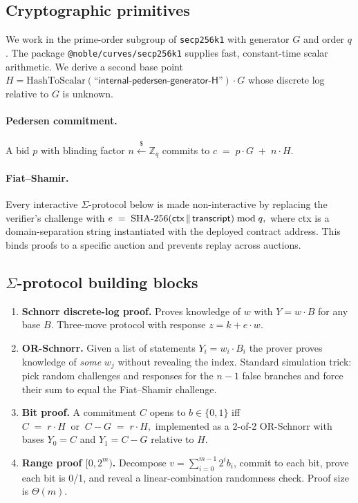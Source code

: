 \documentclass[11pt,a4paper]{article}
\begin{document}
\subsection{Cryptographic primitives}

We work in the prime-order subgroup of \texttt{secp256k1} with generator $G$
and order $q$. The package \texttt{@noble/curves/secp256k1} supplies fast,
constant-time scalar arithmetic. We derive a second base point
$H = \mathrm{HashToScalar}(\textsf{``internal-pedersen-generator-H''})\cdot G$
whose discrete log relative to $G$ is unknown.

\paragraph{Pedersen commitment.} A bid $p$ with blinding factor
$n \xleftarrow{\$} \mathbb{Z}_q$ commits to
$
c \;=\; p\cdot G \;+\; n\cdot H.
$

\paragraph{Fiat--Shamir.} Every interactive $\Sigma$-protocol below is made
non-interactive by replacing the verifier's challenge with
$
e \;=\; \mathrm{SHA{\text -}256}(\textsf{ctx} \,\|\, \textsf{transcript}) \bmod q,
$
where \textsf{ctx} is a domain-separation string instantiated with the
deployed contract address. This binds proofs to a specific auction and
prevents replay across auctions.

\subsection{$\Sigma$-protocol building blocks}

\begin{enumerate}[leftmargin=*]
\item \textbf{Schnorr discrete-log proof.} Proves knowledge of $w$ with
$Y = w\cdot B$ for any base $B$. Three-move protocol with response
$z = k + e\cdot w$.
\item \textbf{OR-Schnorr.} Given a list of statements $Y_i = w_i\cdot B_i$ the
prover proves knowledge of \emph{some} $w_j$ without revealing the index.
Standard simulation trick: pick random challenges and responses for the
$n-1$ false branches and force their sum to equal the Fiat--Shamir challenge.
\item \textbf{Bit proof.} A commitment $C$ opens to $b\in\{0,1\}$ iff
$
C \;=\; r\cdot H \;\;\text{or}\;\; C - G \;=\; r\cdot H,
$
implemented as a 2-of-2 OR-Schnorr with bases $Y_0 = C$ and $Y_1 = C - G$
relative to $H$.
\item \textbf{Range proof $[0, 2^m)$.} Decompose $v = \sum_{i=0}^{m-1} 2^i b_i$,
commit to each bit, prove each bit is 0/1, and reveal a linear-combination
randomness check. Proof size is $\Theta(m)$.
\end{enumerate}
\end{document}
